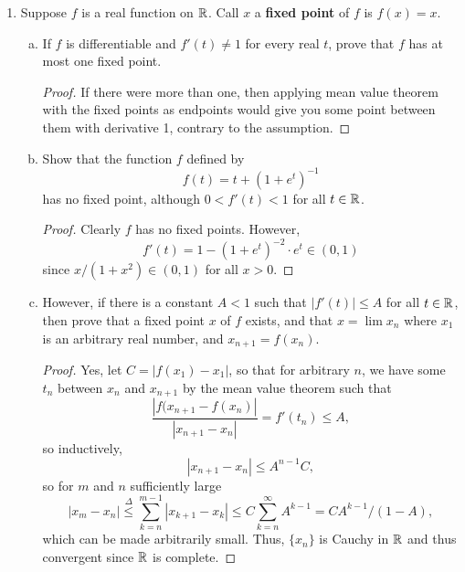 \begin{enumerate}[1.]
\begin{proof}
        For the infiitely differentiable case, it is possible to define a similar function. This depends largely on the fact that $\R$ is separable.
    \end{proof}
\item %
    Suppose $f$ is a real function on $\R$. Call $x$ a \textbf{fixed point} of $f$ is $f(x) = x$. 
    \begin{enumerate}[(a)]
    \item If $f$ is differentiable and $f'(t) \ne 1$ for every real $t$, prove that $f$ has at most one fixed point.
        \begin{proof}
            If there were more than one, then applying mean value theorem with the fixed points as endpoints would give you some point between them with derivative 1, contrary to the assumption.
        \end{proof}
    \item Show that the function $f$ defined by
        \[
            f(t) = t + (1 + e^t)^{-1}
        \]
        has no fixed point, although $0 < f'(t) < 1$ for all $t \in \mathbb{R}$.

        \begin{proof}
            Clearly $f$ has no fixed points. However,
            \[
                f'(t) = 1 - (1 + e^t)^{-2} \cdot e^t \in (0, 1)
            \]
            since $x/(1+x^2) \in (0, 1)$ for all $x > 0$.
        \end{proof}
    \item However, if there is a constant $A < 1$ such that $|f'(t)| \le A$ for all $t \in \mathbb{R}$, then prove that a fixed point $x$ of $f$ exists, and that $x = \lim x_n$ where $x_1$ is an arbitrary real number, and $x_{n+1} = f(x_n)$.

        \begin{proof}
            Yes, let $C = |f(x_1) - x_1|$, so that for arbitrary $n$, we have some $t_n$ between $x_n$ and $x_{n+1}$ by the mean value theorem such that
            \[
                \frac{| f(x_{n+1} - f(x_n) |}{| x_{n+1} - x_n |} = f'(t_n) \le A,
            \]
            so inductively,
            \[
                |x_{n+1} - x_n| \le A^{n-1} C,
            \]
            so for $m$ and $n$ sufficiently large
            \[
                |x_m - x_n| \overset{\Delta}{\le} \sum_{k=n}^{m-1} |x_{k+1} - x_k| \le C\sum_{k=n}^{\infty} A^{k-1} = CA^{k-1}/(1 - A),
            \]
            which can be made arbitrarily small. Thus, $\{x_n\}$ is Cauchy in $\R$ and thus convergent since $\R$ is complete.


\end{proof}
\end{enumerate}
\end{enumerate}
